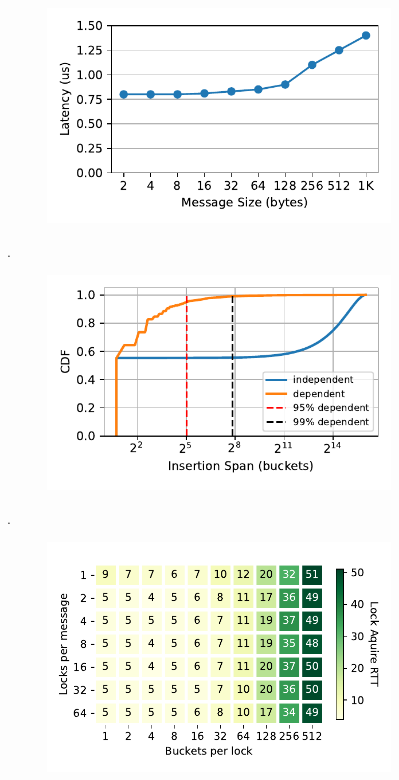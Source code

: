 \begin{figure}[t]
    \centering
    \begin{subfigure}{0.3\linewidth}
        \includegraphics[width=0.99\linewidth]{fig/rdma_latency.pdf}
        \label{fig:rdma_latency}
    \end{subfigure}.
    \begin{subfigure}{0.3\linewidth}
        \includegraphics[width=0.99\linewidth]{fig/insertion_span.pdf}
        \label{fig:insertion_span}
    \end{subfigure}.
    \begin{subfigure}{0.3\linewidth}
        \includegraphics[width=0.99\linewidth]{fig/buckets_per_lock_vs_locks_per_message_copy.pdf}

\end{subfigure}
\end{figure}
